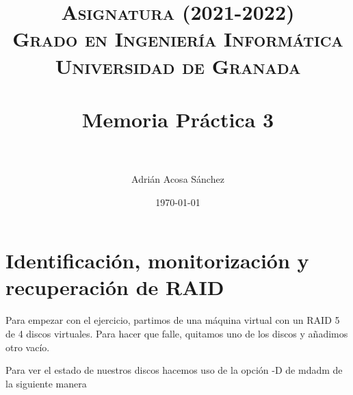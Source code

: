 


\title{	
\normalfont \normalsize 
\textsc{\textbf{Asignatura (2021-2022)} \\ Grado en Ingeniería Informática \\ Universidad de Granada} \\ [25pt] %
\horrule{0.5pt} \\[0.4cm] %
\huge Memoria Práctica 3 \\ %
\horrule{2pt} \\[0.5cm] %
}

\author{Adrián Acosa Sánchez} %

\date{\normalsize\today} %




\maketitle %

\newpage %

\tableofcontents %
 
\newpage


\section{Identificación, monitorización y recuperación de RAID}

Para empezar con el ejercicio, partimos de una máquina virtual con un RAID 5 de 4 discos virtuales. Para hacer que falle, quitamos uno de los discos y añadimos otro vacío.

Para ver el estado de nuestros discos hacemos uso de la opción -D de mdadm de la siguiente manera

